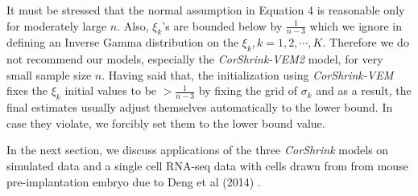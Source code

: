 It must be stressed that the normal assumption in Equation 4 is reasonable only for moderately large $n$. Also, $\xi_{k}$'s are bounded below by $\frac{1}{n-3}$ which we ignore in defining an Inverse Gamma distribution on the $\xi_{k}, k=1,2,\cdots, K$. Therefore we do not recommend our models,  especially the \textit{CorShrink-VEM2} model, for very small sample size $n$. Having said that, the initialization using \textit{CorShrink-VEM} fixes the $\xi_{k}$ initial values to be $ > \frac{1}{n-3}$ by fixing the grid of $\sigma_{k}$ and as a result, the final estimates usually adjust themselves automatically to the lower bound. In case they violate, we forcibly set them to the lower bound value.

In the next section, we discuss applications of the three \textit{CorShrink} models on simulated data and a  single cell RNA-seq data with cells drawn from from mouse pre-implantation embryo due to Deng et al (2014) \cite{Deng2014}. 




